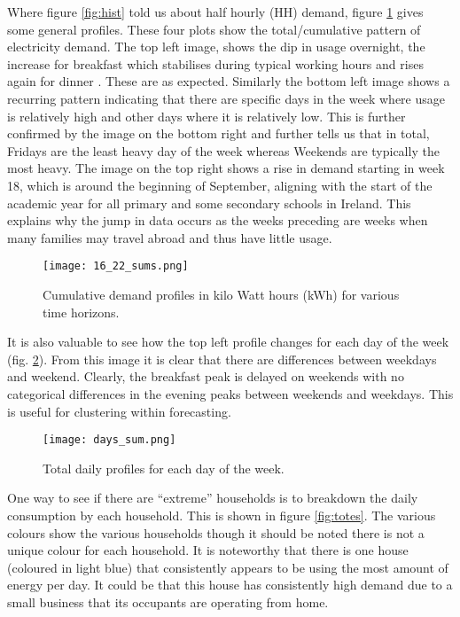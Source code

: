 Where figure \ref{fig:hist} told us about half hourly (HH) demand, figure \ref{fig:sums} gives some general profiles. These four plots show the total/cumulative pattern of electricity demand. The top left image, shows the dip in usage overnight, the increase for breakfast which stabilises during typical working hours and rises again for dinner . These are as expected. Similarly the bottom left image shows a recurring pattern indicating that there are specific days in the week where usage is relatively high and other days where it is relatively low. This is further confirmed by the image on the bottom right and further tells us that in total, Fridays are the least heavy day of the week whereas Weekends are typically the most heavy. The image on the top right shows a rise in demand starting in week 18, which is around the beginning of September, aligning with the start of the academic year for all primary and some secondary schools in Ireland. This explains why the jump in data occurs as the weeks preceding are weeks when many families may travel abroad and thus have little usage.

\begin{figure}
\centering
\texttt{[image: 16\_22\_sums.png]}
\caption{Cumulative demand profiles in kilo Watt hours (kWh) for various time horizons.}
\label{fig:sums} 
\end{figure}

It is also valuable to see how the top left profile changes for each day of the week (fig. \ref{fig:days}). From this image it is clear that there are differences between weekdays and weekend. Clearly, the breakfast peak is delayed on weekends with no categorical differences in the evening peaks between weekends and weekdays. This is useful for clustering within forecasting.

\begin{figure}
\centering
\texttt{[image: days\_sum.png]}
\caption{Total daily profiles for each day of the week.}
\label{fig:days} 
\end{figure}

One way to see if there are ``extreme'' households is to breakdown the daily consumption by each household. This is shown in figure \ref{fig:totes}. The various colours show the various households though it should be noted there is not a unique colour for each household. It is noteworthy that there is one house (coloured in light blue) that consistently appears to be using the most amount of energy per day. It could be that this house has consistently high demand due to a small business that its occupants are operating from home.

